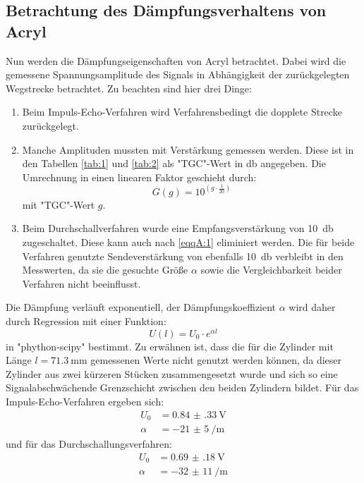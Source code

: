 \subsection{Betrachtung des Dämpfungsverhaltens von Acryl}
Nun werden die Dämpfungseigenschaften von Acryl betrachtet. Dabei wird die gemessene
Spannungsamplitude des Signals in Abhängigkeit der zurückgelegten Wegstrecke betrachtet.
Zu beachten sind hier drei Dinge:
\begin{enumerate}
  \item Beim Impuls-Echo-Verfahren wird Verfahrensbedingt die dopplete Strecke zurückgelegt.
  \item Manche Amplituden mussten mit Verstärkung gemessen werden. Diese ist in den Tabellen
  \ref{tab:1} und \ref{tab:2} als "TGC"-Wert in \si{\decibel} angegeben. Die Umrechnung in einen
  linearen Faktor geschieht durch:
  \begin{equation}
    G(g) = 10^{ \left( g \cdot \frac{1}{20} \right)}
    \label{eqqA:1}
  \end{equation}
  mit "TGC"-Wert $g$.
  \item Beim Durchschallverfahren wurde eine Empfangsverstärkung von \SI{10}{\decibel}
  zugeschaltet. Diese kann auch nach \ref{eqqA:1} eliminiert werden. Die für beide Verfahren
  genutzte Sendeverstärkung von ebenfalls \SI{10}{\decibel} verbleibt in den Messwerten,
  da sie die gesuchte Größe $\alpha$ sowie die Vergleichbarkeit beider Verfahren nicht beeinflusst.
\end{enumerate}
Die Dämpfung verläuft exponentiell, der Dämpfungskoeffizient $\alpha$ wird daher durch Regression
mit einer Funktion:
\begin{equation}
  U(l) = U_0 \cdot e^{\alpha l}
\end{equation}
in "phython-scipy" bestimmt. Zu erwähnen ist, dass die für die Zylinder mit Länge
$l=\SI{71.3}{\milli\metre}$ gemessenen Werte nicht genutzt werden können, da dieser
Zylinder aus zwei kürzeren Stücken zusammengesetzt wurde und sich so eine Signalabschwächende
Grenzschicht zwischen den beiden Zylindern bildet. Für das Impuls-Echo-Verfahren ergeben sich:
\begin{align*}
  U_0 &= \SI{0.84(33)}{\volt}\\
  \alpha &= \SI[per-mode=reciprocal]{-21(5)}{\per\metre}
\end{align*}
und für das Durchschallungsverfahren:
\begin{align*}
  U_0 &= \SI{0.69(18)}{\volt}\\
  \alpha &= \SI[per-mode=reciprocal]{-32(11)}{\per\metre}
\end{align*}
